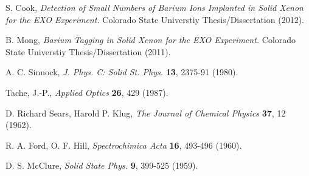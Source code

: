 \documentclass[PhD, copyrightpage]{csuthesis} %
\begin{document}
\begin{thebibliography}{00}
 
  S. Cook, \emph{Detection of Small Numbers of Barium Ions Implanted in Solid Xenon for the EXO Experiment.}  Colorado State Universtiy Thesis/Dissertation (2012).
 
  B. Mong, \emph{Barium Tagging in Solid Xenon for the EXO Experiment.}  Colorado State Universtiy Thesis/Dissertation (2011).
 
  A. C. Sinnock, \emph{J. Phys. C: Solid St. Phys.} \textbf{13}, 2375-91 (1980).
 
   Tache, J.-P., \emph{Applied Optics} \textbf{26}, 429 (1987).
 
  D. Richard Sears, Harold P. Klug, \emph{The Journal of Chemical Physics} \textbf{37}, 12 (1962).
 
 
  R. A. Ford, O. F. Hill, \emph{Spectrochimica Acta} \textbf{16}, 493-496 (1960).
 
  D. S. McClure, \emph{Solid State Phys.} \textbf{9}, 399-525 (1959).
 \end{thebibliography}
% 
\end{document}
